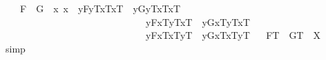\begin{isabellebody}
\ \ \ \ {\isachardoublequoteopen}F{}\ \isactrlbold {\isacharequal}\ G{}\ {\isasymequiv}\ \isactrlbold {\isasymforall}x{}\ x{}{\isachardot}{\isacharparenleft}\ \ {\isacharparenleft}\isactrlbold {\isasymlambda}y{\isachardot}{\isasymlparr}F{}{\isacharcomma}y\isactrlsup T{\isacharcomma}x{}\isactrlsup T{\isacharcomma}x{}\isactrlsup T{\isasymrparr}{\isacharparenright}\ \isactrlbold {\isacharequal}\ {\isacharparenleft}\isactrlbold {\isasymlambda}y{\isachardot}{\isasymlparr}G{}{\isacharcomma}y\isactrlsup T{\isacharcomma}x{}\isactrlsup T{\isacharcomma}x{}\isactrlsup T{\isasymrparr}{\isacharparenright}\isanewline
\ \ \ \ \ \ \ \ \ \ \ \ \ \ \ \ \ \ \ \ \ \ \ \ \ \ \ \ \ \isactrlbold {\isasymand}\ {\isacharparenleft}\isactrlbold {\isasymlambda}y{\isachardot}{\isasymlparr}F{}{\isacharcomma}x{}\isactrlsup T{\isacharcomma}y\isactrlsup T{\isacharcomma}x{}\isactrlsup T{\isasymrparr}{\isacharparenright}\ \isactrlbold {\isacharequal}\ {\isacharparenleft}\isactrlbold {\isasymlambda}y{\isachardot}{\isasymlparr}G{}{\isacharcomma}x{}\isactrlsup T{\isacharcomma}y\isactrlsup T{\isacharcomma}x{}\isactrlsup T{\isasymrparr}{\isacharparenright}\isanewline
\ \ \ \ \ \ \ \ \ \ \ \ \ \ \ \ \ \ \ \ \ \ \ \ \ \ \ \ \ \isactrlbold {\isasymand}\ {\isacharparenleft}\isactrlbold {\isasymlambda}y{\isachardot}{\isasymlparr}F{}{\isacharcomma}x{}\isactrlsup T{\isacharcomma}x{}\isactrlsup T{\isacharcomma}y\isactrlsup T{\isasymrparr}{\isacharparenright}\ \isactrlbold {\isacharequal}\ {\isacharparenleft}\isactrlbold {\isasymlambda}y{\isachardot}{\isasymlparr}G{}{\isacharcomma}x{}\isactrlsup T{\isacharcomma}x{}\isactrlsup T{\isacharcomma}y\isactrlsup T{\isasymrparr}{\isacharparenright}{\isacharparenright}{\isachardoublequoteclose}\isanewline
\isanewline
\ \isamarkupfalse%
\ {\isachardoublequoteopen}F{}\isactrlsup T\ \isactrlbold {\isacharequal}\ G{}\isactrlsup T\ {\isacharequal}\ X{\isachardoublequoteclose}%
\isadelimproof
\ %
\endisadelimproof
%
\isatagproof
{}\isamarkupfalse%
\ simp\ \isamarkupfalse%
\ %
\end{isabellebody}
